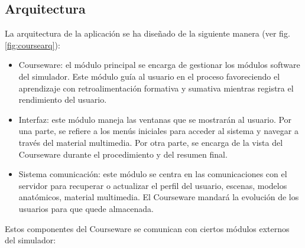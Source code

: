 \subsection{Arquitectura}
\label{course:arq}
La arquitectura de la aplicación se ha diseñado de la siguiente manera (ver fig. \ref{fig:coursearq}):
\begin{itemize}
    \item \ac{Courseware}: el módulo principal se encarga de gestionar los módulos software del simulador. Este módulo guía al usuario en el proceso favoreciendo el aprendizaje con retroalimentación formativa y sumativa mientras registra el rendimiento del usuario.%
    \item Interfaz: este módulo maneja las ventanas que se mostrarán al usuario. Por una parte, se refiere a los menús iniciales para acceder al sistema y navegar a través del material multimedia. Por otra parte, se encarga de la vista del \ac{Courseware} durante el procedimiento y del resumen final.

\item Sistema comunicación: este módulo se centra en las comunicaciones con el servidor para recuperar o actualizar el perfil del usuario, escenas, modelos anatómicos, material multimedia. El \ac{Courseware} mandará la evolución de los usuarios para que quede almacenada.
\end{itemize}


Estos componentes del \ac{Courseware} se comunican con ciertos módulos externos del simulador:

